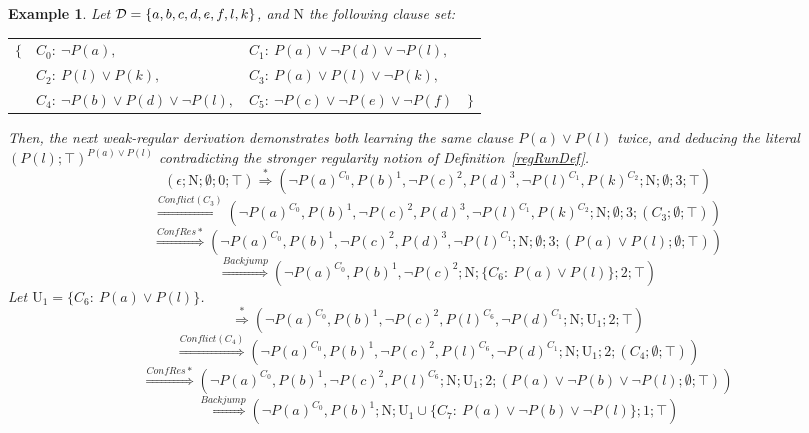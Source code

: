 \documentclass[a4paper]{article}
\newtheorem{example}[defi]{Example}
\newcommand\exClauseNo[1]{C_{#1}} \newcommand{\rst}[1]{|_{#1}}
\begin{document}
\begin{example}
Let $\mathcal{D} = \{ a, b, c, d, e, f, l, k \}$, and $\text{N}$ the following clause set:
\begin{center}\begin{tabular}{rlll}
$\{$ & $\exClauseNo{0}:~\neg P(a), $ & $\exClauseNo{1}:~P(a) \lor \neg P(d) \lor \neg P(l), $ & \\
       & $\exClauseNo{2}:~P(l) \lor P(k),$ & $\exClauseNo{3}:~P(a) \lor P(l) \lor \neg P (k), $ & \\
       & $\exClauseNo{4}:~\neg P(b) \lor P(d) \lor \neg P(l), $ & $\exClauseNo{5}:~\neg P(c) \lor \neg P(e) \lor \neg P(f)$ & $\}$ \\
\end{tabular}\end{center}
Then, the next weak-regular derivation demonstrates both learning the same clause $P(a) \lor P(l)$ twice, 
and deducing the literal $(P(l); \top)^{P(a) \lor P(l)}$ 
contradicting the stronger regularity notion of Definition~\ref{regRunDef}.
\[
(\epsilon; \text{N}; \emptyset; 0; \top)
 \stackrel{*}{\Rightarrow}
(\neg P(a)^{\exClauseNo{0}}, P(b)^1, \neg P(c)^2, P(d)^3, \neg P(l)^{\exClauseNo{1}}, P(k)^{\exClauseNo{2}}; \text{N}; \emptyset; 3; \top)
\]
\[
\stackrel{Conflict(\exClauseNo{3})}{\Rightarrow}
(\neg P(a)^{\exClauseNo{0}}, P(b)^1, \neg P(c)^2, P(d)^3, \neg P(l)^{\exClauseNo{1}}, P(k)^{\exClauseNo{2}}; \text{N}; \emptyset; 3; (\exClauseNo{3};\emptyset; \top))
\]
\[
\stackrel{ConfRes*}{\Rightarrow}
(\neg P(a)^{\exClauseNo{0}}, P(b)^1, \neg P(c)^2, P(d)^3, \neg P(l)^{\exClauseNo{1}}; \text{N}; \emptyset; 3; (P(a) \lor P(l);\emptyset; \top))
\]
\[
\stackrel{Backjump}{\Rightarrow}
(\neg P(a)^{\exClauseNo{0}}, P(b)^1, \neg P(c)^2; \text{N}; \{\exClauseNo{6}:~P(a) \lor P(l)\}; 2; \top)
\]
Let $\text{U}_1 = \{\exClauseNo{6}:~P(a) \lor P(l)\}$.
\[
\stackrel{*}{\Rightarrow}
(\neg P(a)^{\exClauseNo{0}}, P(b)^1, \neg P(c)^2, P(l)^{\exClauseNo{6}}, \neg P(d)^{\exClauseNo{1}}; \text{N}; \text{U}_1; 2; \top)
\]
\[
\stackrel{Conflict(\exClauseNo{4})}{\Rightarrow}
(\neg P(a)^{\exClauseNo{0}}, P(b)^1, \neg P(c)^2, P(l)^{\exClauseNo{6}}, \neg P(d)^{\exClauseNo{1}}; \text{N}; \text{U}_1; 2;(\exClauseNo{4};\emptyset;\top))
\]
\[
\stackrel{ConfRes*}{\Rightarrow}
(\neg P(a)^{\exClauseNo{0}}, P(b)^1, \neg P(c)^2, P(l)^{\exClauseNo{6}}; \text{N}; \text{U}_1; 2;(P(a) \lor \neg P(b) \lor \neg P(l);\emptyset;\top))
\]
\[
\stackrel{Backjump}{\Rightarrow}
(\neg P(a)^{\exClauseNo{0}}, P(b)^1; \text{N}; \text{U}_1 \cup \{\exClauseNo{7}:~P(a) \lor \neg P(b) \lor \neg P(l)\}; 1;\top)
\]
\end{example}
\end{document}

